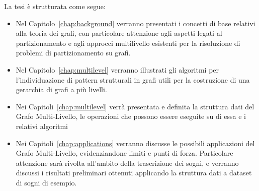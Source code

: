 La tesi \`e strutturata come segue:
\begin{itemize}
    \item Nel Capitolo~\ref{chap:background} verranno presentati i concetti di base relativi alla teoria dei grafi,
    con particolare attenzione agli aspetti legati al partizionamento e agli approcci multilivello esistenti per la
    risoluzione di problemi di partizionamento su grafi.
    \item Nel Capitolo~\ref{chap:multilevel} verranno illustrati gli algoritmi per l'individuazione di pattern
    strutturali in grafi utili per la costruzione di una gerarchia di grafi a pi\`u livelli.
    \item Nei Capitoli~\ref{chap:multilevel} verr\`a presentata e definita la struttura dati del Grafo Multi-Livello,
    le operazioni che possono essere eseguite su di essa e i relativi algoritmi
    \item Nei Capitoli~\ref{chap:applications} verranno discusse le possibili applicazioni del Grafo Multi-Livello,
    evidenziandone limiti e punti di forza.
    Particolare attenzione sar\`a rivolta all'ambito della trascrizione dei sogni, e verranno discussi i risultati
    preliminari ottenuti applicando la struttura dati a dataset di sogni di esempio.
\end{itemize}
